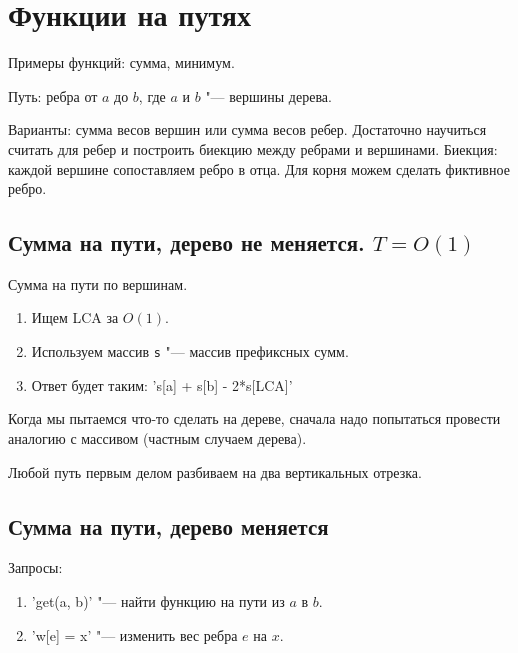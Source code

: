 \chapter{Функции на путях}

Примеры функций: сумма, минимум.

Путь: ребра от $a$ до $b$, где $a$ и $b$ "--- вершины дерева.

Варианты: сумма весов вершин или сумма весов ребер.
Достаточно научиться считать для ребер и построить биекцию между ребрами и вершинами.
Биекция: каждой вершине сопоставляем ребро в отца.
Для корня можем сделать фиктивное ребро.

\section{Сумма на пути, дерево не меняется. \texorpdfstring{$T = O(1)$}{T = O(1)}}

Сумма на пути по вершинам.

\begin{enumerate}
	\item Ищем LCA за $O\left(1\right)$.
	\item Используем массив \verb's' "--- массив префиксных сумм.
	\item Ответ будет таким: \cpp's[a] + s[b] - 2*s[LCA]'
\end{enumerate}


\begin{Rem}
	Когда мы пытаемся что-то сделать на дереве, сначала надо попытаться провести аналогию с массивом (частным случаем дерева).
\end{Rem}

\begin{Rem}
	Любой путь первым делом разбиваем на два вертикальных отрезка.
\end{Rem}


\section{Сумма на пути, дерево меняется}

Запросы:
\begin{enumerate}
	\item \cpp'get(a, b)' "--- найти функцию на пути из $a$ в $b$.
	\item \cpp'w[e] = x' "--- изменить вес ребра $e$ на $x$.
\end{enumerate}

